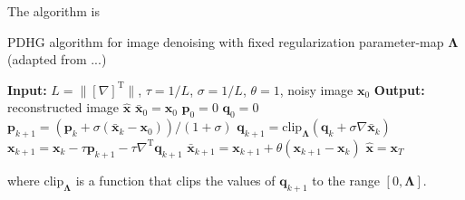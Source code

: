 \documentclass[12pt]{article}
\begin{document}
The algorithm is

\begin{algorithm}[H]
\caption{PDHG algorithm for image denoising with fixed regularization parameter-map $\boldsymbol{\Lambda}$ (adapted from ...)}
\begin{algorithmic}[1]
\STATE \textbf{Input:} $L = \| [\nabla]^\text{T} \|$, $\tau = 1/L$, $\sigma = 1/L$, $\theta = 1$, noisy image $\mathbf{x}_0$
\STATE \textbf{Output:} reconstructed image $\hat{\mathbf{x}}$
\STATE $\bar{\mathbf{x}}_0 = \mathbf{x}_0$
\STATE $\mathbf{p}_0 = 0$
\STATE $\mathbf{q}_0 = 0$
    \STATE $\mathbf{p}_{k+1} = \left(\mathbf{p}_k + \sigma ( \bar{\mathbf{x}}_k - \mathbf{x}_0)\right) / (1 + \sigma)$
    \STATE $\mathbf{q}_{k+1} = \text{clip}_{\boldsymbol{\Lambda}} \left(\mathbf{q}_k + \sigma \nabla \bar{\mathbf{x}}_k \right)$
    \STATE $\mathbf{x}_{k+1} = \mathbf{x}_k - \tau \mathbf{p}_{k+1} - \tau \nabla^\text{T} \mathbf{q}_{k+1}$
    \STATE $\bar{\mathbf{x}}_{k+1} = \mathbf{x}_{k+1} + \theta (\mathbf{x}_{k+1} - \mathbf{x}_k)$
\ENDFOR
\STATE $\hat{\mathbf{x}} = \mathbf{x}_T$
\end{algorithmic}
\end{algorithm}

where $\text{clip}_{\boldsymbol{\Lambda}}$ is a function that clips the values of $\mathbf{q}_{k+1}$ to the range $[0, \boldsymbol{\Lambda}]$.






\end{document}
